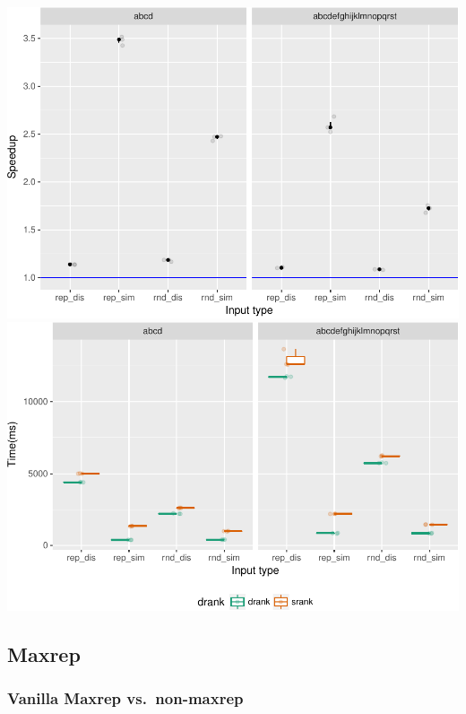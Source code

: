 \documentclass[]{article}
\begin{document}
\includegraphics{sea_2018_files/figure-latex/allflags_plot-1.pdf}
\includegraphics{sea_2018_files/figure-latex/allflags_plot-2.pdf}

\subsection{Maxrep}\label{maxrep}

\subsubsection{Vanilla Maxrep
vs.~non-maxrep}\label{vanilla-maxrep-vs.non-maxrep}
\end{document}
